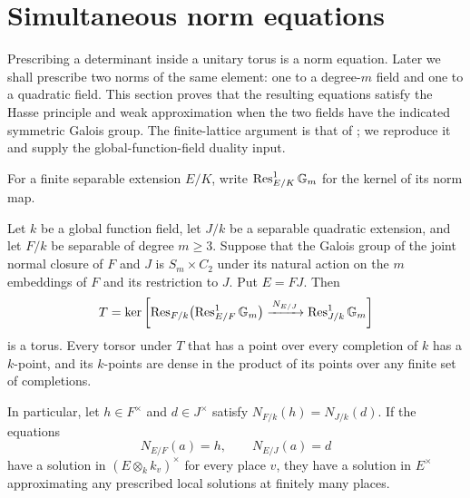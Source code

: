 \section{Simultaneous norm equations}\label{sec:norm-tori}

Prescribing a determinant inside a unitary torus is a norm equation.
Later we shall prescribe two norms of the same element: one to a
degree-$m$ field and one to a quadratic field.  This section proves
that the resulting equations satisfy the Hasse principle and weak
approximation when the two fields have the indicated symmetric Galois
group.  The finite-lattice argument is that of
\cite[Lemmas~2.7--2.9]{MPNF}; we reproduce it and supply the
global-function-field duality input.

For a finite separable extension $E/K$, write
$\operatorname{Res}^1_{E/K}\mathbb G_m$ for the kernel of its norm map.

\begin{proposition}\label{tor:norm-approximation}
Let $k$ be a global function field, let $J/k$ be a separable quadratic
extension, and let $F/k$ be separable of degree $m\geq3$.
Suppose that the Galois group of the joint normal closure of $F$ and
$J$ is $S_m\times C_2$ under its natural action on the $m$
embeddings of $F$ and its restriction to $J$.
Put $E=FJ$.  Then
\begin{equation}\label{tor:norm-kernel}
 T=\ker\left[
 \operatorname{Res}_{F/k}\bigl(\operatorname{Res}^1_{E/F}\mathbb G_m\bigr)
 \xrightarrow{\,N_{E/J}\,}\operatorname{Res}^1_{J/k}\mathbb G_m
 \right]
\end{equation}
is a torus.  Every torsor under $T$ that has a point over every
completion of $k$ has a $k$-point, and its $k$-points are dense in
the product of its points over any finite set of completions.

In particular, let $h\in F^\times$ and $d\in J^\times$ satisfy
$N_{F/k}(h)=N_{J/k}(d)$.  If the equations
\begin{equation}\label{tor:two-norms}
                 N_{E/F}(a)=h,\qquad N_{E/J}(a)=d
\end{equation}
have a solution in $(E\otimes_k k_v)^\times$ for every place $v$,
they have a solution in $E^\times$ approximating any prescribed
local solutions at finitely many places.
\end{proposition}

